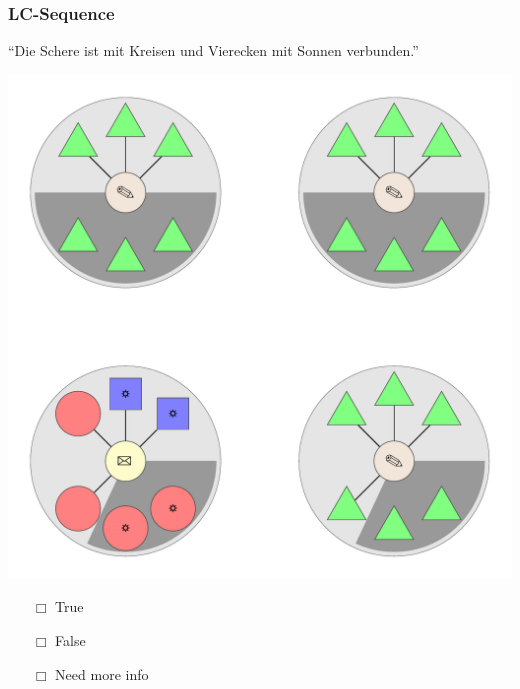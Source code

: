 \documentclass[fleqn,10pt,serif,xcolor=dvipsnames]{beamer}
\newcommand{\LC}{LC\xspace}
\newcommand{\mymark}[1]{{\color{blue}{#1}}}
\begin{document}
\begin{frame}
  \frametitle{\LC-Sequence}
  \begin{center}
    ``Die Schere ist mit Kreisen und Vierecken mit Sonnen verbunden.''

    \vspace{0.1cm}

    \includegraphics[width=0.5 \textwidth]{../../pictures/lc_01_4.pdf}

    \vspace{0.1cm}

    \begin{multicols}{3}
      \begin{itemize} 
      \item[$\Box$] True\\
        \onslide<2>{$\leadsto$  \mymark{false}}
      \item[$\Box$] False\\
        \onslide<2>{$\leadsto$ \mymark{false}}
      \item[$\Box$] Need more info 
      \end{itemize}
    \end{multicols}

  \end{center}
\end{frame}
\end{document}
